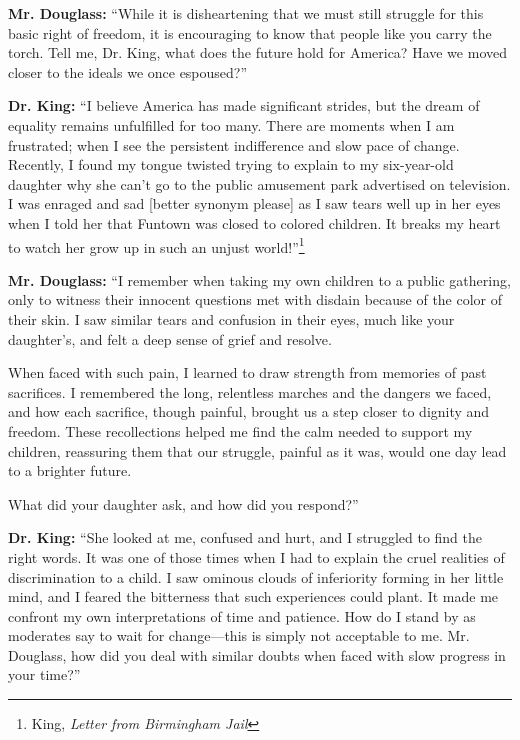 \documentclass[12pt]{article}
\begin{document}
\bigskip

\textbf{Mr. Douglass:} “While it is disheartening that we must still struggle for this basic right of freedom, it is encouraging to know that people like you carry the torch. Tell me, Dr. King, what does the future hold for America? Have we moved closer to the ideals we once espoused?”

\textbf{Dr. King:} “I believe America has made significant strides, but the dream of equality remains unfulfilled for too many. There are moments when I am frustrated; when I see the persistent indifference and slow pace of change. Recently, I found my tongue twisted trying to explain to my six-year-old daughter why she can’t go to the public amusement park advertised on television. I was enraged and sad [better synonym please] as I saw tears well up in her eyes when I told her that Funtown was closed to colored children. It breaks my heart to watch her grow up in such an unjust world!”\footnote{King, \textit{Letter from Birmingham Jail}}

\bigskip

\textbf{Mr. Douglass:} “I remember when taking my own children to a public gathering, only to witness their innocent questions met with disdain because of the color of their skin. I saw similar tears and confusion in their eyes, much like your daughter’s, and felt a deep sense of grief and resolve. 

When faced with such pain, I learned to draw strength from memories of past sacrifices. I remembered the long, relentless marches and the dangers we faced, and how each sacrifice, though painful, brought us a step closer to dignity and freedom. These recollections helped me find the calm needed to support my children, reassuring them that our struggle, painful as it was, would one day lead to a brighter future. 

What did your daughter ask, and how did you respond?”

\textbf{Dr. King:} “She looked at me, confused and hurt, and I struggled to find the right words. It was one of those times when I had to explain the cruel realities of discrimination to a child. I saw ominous clouds of inferiority forming in her little mind, and I feared the bitterness that such experiences could plant. It made me confront my own interpretations of time and patience. How do I stand by as moderates say to wait for change—this is simply not acceptable to me. Mr. Douglass, how did you deal with similar doubts when faced with slow progress in your time?”
\end{document}
